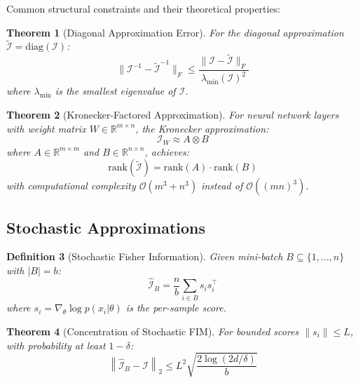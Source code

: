 \documentclass[11pt]{article}
\newtheorem{theorem}{Theorem}
\newtheorem{definition}[theorem]{Definition}
\begin{document}
Common structural constraints and their theoretical properties:

\begin{theorem}[Diagonal Approximation Error]
\label{thm:diagonal_approx}
For the diagonal approximation $\tilde{\mathcal{I}} = \text{diag}(\mathcal{I})$:
\begin{equation}
\|\mathcal{I}^{-1} - \tilde{\mathcal{I}}^{-1}\|_F \leq \frac{\|\mathcal{I} - \tilde{\mathcal{I}}\|_F}{\lambda_{\min}(\mathcal{I})^2}
\end{equation}
where $\lambda_{\min}$ is the smallest eigenvalue of $\mathcal{I}$.
\end{theorem}

\begin{theorem}[Kronecker-Factored Approximation]
\label{thm:kronecker}
For neural network layers with weight matrix $W \in \mathbb{R}^{m \times n}$, the Kronecker approximation:
\begin{equation}
\mathcal{I}_W \approx A \otimes B
\end{equation}
where $A \in \mathbb{R}^{m \times m}$ and $B \in \mathbb{R}^{n \times n}$, achieves:
\begin{equation}
\text{rank}(\tilde{\mathcal{I}}) = \text{rank}(A) \cdot \text{rank}(B)
\end{equation}
with computational complexity $\mathcal{O}(m^3 + n^3)$ instead of $\mathcal{O}((mn)^3)$.
\end{theorem}

\subsection{Stochastic Approximations}

\begin{definition}[Stochastic Fisher Information]
Given mini-batch $B \subseteq \{1, \ldots, n\}$ with $|B| = b$:
\begin{equation}
\hat{\mathcal{I}}_B = \frac{n}{b} \sum_{i \in B} s_i s_i^\top
\end{equation}
where $s_i = \nabla_\theta \log p(x_i|\theta)$ is the per-sample score.
\end{definition}

\begin{theorem}[Concentration of Stochastic FIM]
\label{thm:stochastic_concentration}
For bounded scores $\|s_i\| \leq L$, with probability at least $1-\delta$:
\begin{equation}
\left\|\hat{\mathcal{I}}_B - \mathcal{I}\right\|_2 \leq L^2\sqrt{\frac{2\log(2d/\delta)}{b}}
\end{equation}
\end{theorem}
\end{document}
